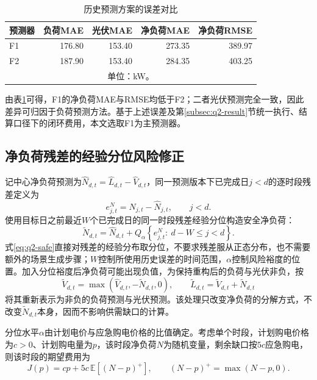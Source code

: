 \begin{table}[htbp]
\centering
\caption{历史预测方案的误差对比}
\label{tab:q2_forecast_error}
\small
\begin{tabular}{lrrrr}
\toprule
预测器 & 负荷MAE & 光伏MAE & 净负荷MAE & 净负荷RMSE \\
\midrule
F1 & 176.80 & 153.40 & 273.35 & 389.97 \\
F2 & 187.90 & 153.40 & 284.35 & 403.25 \\
\bottomrule
\multicolumn{5}{c}{单位：kW。}\\
\end{tabular}
\end{table}

由表\ref{tab:q2_forecast_error}可得，F1的净负荷MAE与RMSE均低于F2；二者光伏预测完全一致，因此差异可归因于负荷预测方法。基于上述误差及第\ref{subsec:q2-result}节统一执行、结算口径下的闭环费用，本文选取F1为主预测器。


\subsection{净负荷残差的经验分位风险修正}\label{subsec:q2-risk}
记中心净负荷预测为$\widehat N_{d,t}=\widehat L_{d,t}-\widehat V_{d,t}$，同一预测版本下已完成日$j<d$的逐时段残差定义为
\begin{equation}
e^N_{j,t}=N_{j,t}-\widehat N_{j,t},\qquad j<d .
\label{eq:q2-resid}
\end{equation}
使用目标日之前最近$W$个已完成日的同一时段残差经验分位构造安全净负荷：
\begin{equation}
\widetilde N_{d,t}=\widehat N_{d,t}+Q_\alpha\left\{e^N_{j,t}:\ d-W\le j<d\right\}.
\label{eq:q2-safe}
\end{equation}
式\eqref{eq:q2-safe}直接对残差的经验分布取分位，不要求残差服从正态分布，也不需要额外的场景生成步骤；$W$控制所使用历史误差的时间范围，$\alpha$控制风险裕度的位置。加入分位裕度后净负荷可能出现负值，为保持重构后的负荷与光伏非负，按
\begin{equation}
\widetilde V_{d,t}=\max\left(\widehat V_{d,t},-\widetilde N_{d,t},0\right),\qquad
\widetilde L_{d,t}=\widetilde V_{d,t}+\widetilde N_{d,t}
\label{eq:q2-reconstruct}
\end{equation}
将其重新表示为非负的负荷预测与光伏预测。该处理只改变净负荷的分解方式，不改变$\widetilde N_{d,t}$本身，因而不影响供需缺口的计算。

分位水平$\alpha$由计划电价与应急购电价格的比值确定。考虑单个时段，计划购电价格为$c>0$、计划购电量为$p$，该时段净负荷$N$为随机变量，剩余缺口按$5c$应急购电，则该时段的期望费用为
\begin{equation}
J(p)=cp+5c\,\mathbb E\left[(N-p)^+\right],\qquad (N-p)^+=\max(N-p,0).
\label{eq:q2-newsboy}
\end{equation}

